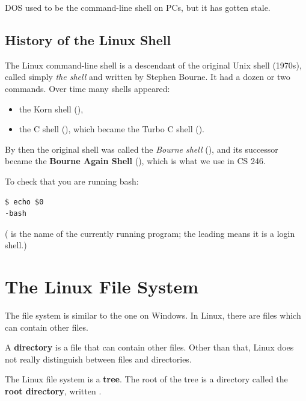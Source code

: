 DOS used to be the command-line shell on PCs, but it has gotten stale.

\subsection{History of the Linux Shell}
The Linux command-line shell is a descendant of the original Unix shell (1970s),
called simply \emph{the shell} and written by Stephen Bourne. It had a dozen or
two commands. Over time many shells appeared:
\begin{itemize}
  \item the Korn shell (),
  \item the C shell (), which became the Turbo C shell ().
\end{itemize}
By then the original shell was called the \emph{Bourne shell} (), and
its successor became the \textbf{Bourne Again Shell} (), which is
what we use in CS 246.

To check that you are running bash:
\begin{lstlisting}[style=bash]
$ echo $0
-bash
\end{lstlisting}
( is the name of the currently running program; the leading \code{-}
means it is a login shell.)

\section{The Linux File System}

The file system is similar to the one on Windows. In Linux, there are files
which can contain other files.

\begin{definition}
A \textbf{directory} is a file that can contain other files. Other than that,
Linux does not really distinguish between files and directories.
\end{definition}

The Linux file system is a \textbf{tree}. The root of the tree is a directory
called the \textbf{root directory}, written \code{/}.

\begin{center}
\end{center}

